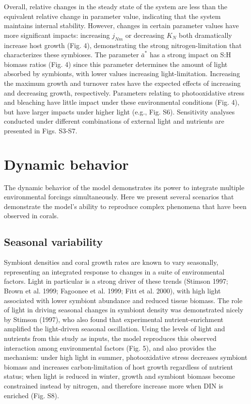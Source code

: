 \documentclass[]{elsarticle} %
\begin{document}
Overall, relative changes in the steady state of the system are less
than the equivalent relative change in parameter value, indicating that
the system maintains internal stability. However, changes in certain
parameter values have more significant impacts: increasing \(j_{Nm}\) or
decreasing \(K_N\) both dramatically increase host growth (Fig. 4),
demonstrating the strong nitrogen-limitation that characterizes these
symbioses. The parameter \(\bar{a}^*\) has a strong impact on S:H
biomass ratios (Fig. 4) since this parameter determines the amount of
light absorbed by symbionts, with lower values increasing
light-limitation. Increasing the maximum growth and turnover rates have
the expected effects of increasing and decreasing growth, respectively.
Parameters relating to photooxidative stress and bleaching have little
impact under these environmental conditions (Fig. 4), but have larger
impacts under higher light (e.g., Fig. S6). Sensitivity analyses
conducted under different combinations of external light and nutrients
are presented in Figs. S3-S7.

\section{Dynamic behavior}\label{dynamic-behavior}

The dynamic behavior of the model demonstrates its power to integrate
multiple environmental forcings simultaneously. Here we present several
scenarios that demonstrate the model's ability to reproduce complex
phenomena that have been observed in corals.

\subsection{Seasonal variability}\label{seasonal-variability}

Symbiont densities and coral growth rates are known to vary seasonally,
representing an integrated response to changes in a suite of
environmental factors. Light in particular is a strong driver of these
trends (Stimson 1997; Brown et al. 1999; Fagoonee et al. 1999; Fitt et
al. 2000), with high light associated with lower symbiont abundance and
reduced tissue biomass. The role of light in driving seasonal changes in
symbiont density was demonstrated nicely by Stimson (1997), who also
found that experimental nutrient-enrichment amplified the light-driven
seasonal oscillation. Using the levels of light and nutrients from this
study as inputs, the model reproduces this observed interaction among
environmental factors (Fig. 5), and also provides the mechanism: under
high light in summer, photooxidative stress decreases symbiont biomass
and increases carbon-limitation of host growth regardless of nutrient
status; when light is reduced in winter, growth and symbiont biomass
become constrained instead by nitrogen, and therefore increase more when
DIN is enriched (Fig. S8).
\end{document}
